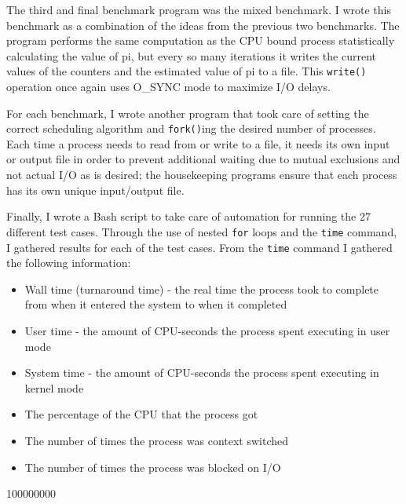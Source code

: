 The third and final benchmark program was the mixed benchmark.  I wrote this benchmark as a combination of the ideas from the previous two benchmarks.  The program performs the same computation as the CPU bound process statistically calculating the value of pi, but every so many iterations it writes the current values of the counters and the estimated value of pi to a file.  This \texttt{write()} operation once again uses O\_SYNC mode to maximize I/O delays.

For each benchmark, I wrote another program that took care of setting the correct scheduling algorithm and \texttt{fork()}ing the desired number of processes.  Each time a process needs to read from or write to a file, it needs its own input or output file in order to prevent additional waiting due to mutual exclusions and not actual I/O as is desired; the housekeeping programs ensure that each process has its own unique input/output file.

Finally, I wrote a Bash script to take care of automation for running the 27 different test cases.  Through the use of nested \texttt{for} loops and the \texttt{time} command, I gathered results for each of the test cases.  From the \texttt{time} command I gathered the following information:
\begin{itemize}
  \item Wall time (turnaround time) - the real time the process took to complete from when it entered the system to when it completed
  \item User time - the amount of CPU-seconds the process spent executing in user mode
  \item System time - the amount of CPU-seconds the process spent executing in kernel mode
  \item The percentage of the CPU that the process got
  \item The number of times the process was context switched
  \item The number of times the process was blocked on I/O
\end{itemize}

100000000
